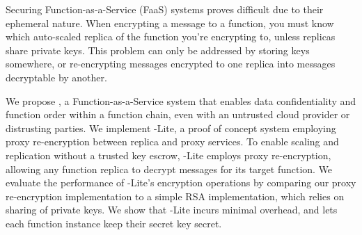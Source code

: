 



Securing Function-as-a-Service (FaaS) systems proves difficult due to their ephemeral nature.
%
When encrypting a message to a function, you must know which auto-scaled replica of the function you're encrypting to, unless replicas share private keys.
%
This problem can only be addressed by storing keys somewhere, or re-encrypting messages encrypted to one replica into messages decryptable by another.

%
We propose \SystemName, a Function-as-a-Service system that enables data
confidentiality and function order within a function chain, even with an
untrusted cloud provider or distrusting parties.
%
%
We implement \SystemName-Lite, a proof of concept system employing proxy re-encryption between replica and proxy services.
To enable scaling and replication without a trusted key escrow, \SystemName-Lite employs
proxy re-encryption, allowing any function replica to decrypt messages for its
target function.
%
We evaluate the performance of \SystemName-Lite's encryption operations by comparing our proxy re-encryption implementation to a simple RSA implementation, which relies on sharing of private keys.
%
We show that \SystemName-Lite incurs minimal overhead, and lets each function instance keep their secret key secret.

